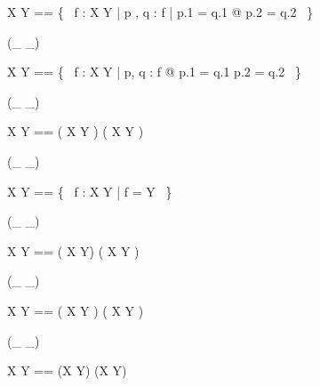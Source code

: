 \begin{zed}
X \pfun Y == \{~ f : X \rel Y | \forall p , q : f | p.1 = q.1 @ p.2 = q.2 ~\}
\end{zed}

\begin{zed}
 \rightassoc (\_ \pinj \_)
\end{zed}

\begin{zed}
X \pinj Y == \{~ f : X \rel Y | \forall p, q : f @ p.1 = q.1 \iff p.2 = q.2 ~\}
\end{zed}

\begin{zed}
 \rightassoc (\_ \inj \_)
\end{zed}

\begin{zed}
X \inj Y == ( X \pinj Y ) \cap ( X \fun Y )
\end{zed}

\begin{zed}
 \rightassoc (\_ \psurj \_)
\end{zed}

\begin{zed}
X \psurj Y == \{~ f : X \pfun Y | \ran f = Y ~\}
\end{zed}

\begin{zed}
 \rightassoc (\_ \surj \_)
\end{zed}

\begin{zed}
X \surj Y == ( X \psurj Y) \cap ( X \fun Y )
\end{zed}

\begin{zed}
 \rightassoc (\_ \bij \_)
\end{zed}

\begin{zed}
X \bij Y == ( X \surj Y ) \cap ( X \inj Y )
\end{zed}

\begin{zed}
 \rightassoc (\_ \ffun \_)
\end{zed}

\begin{zed}
X \ffun Y == (X \pfun Y) \cap \finset (X \cross Y)
\end{zed}

